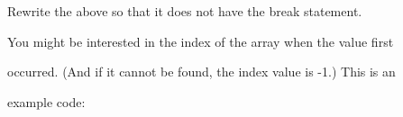 Rewrite the above so that it does not have the break statement.



You might be interested in the index of the array when the value first

occurred. (And if it cannot be found, the index value is -1.) This is an

example code:


